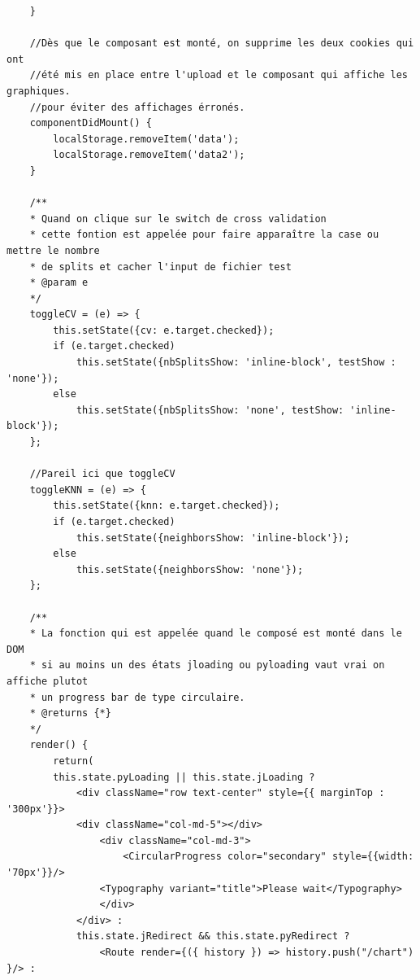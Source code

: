 \documentclass[a4paper,11pt]{article}
\begin{document}
\begin{itemize}
\begin{itemize}
\begin{verbatim}
    }

    //Dès que le composant est monté, on supprime les deux cookies qui ont
    //été mis en place entre l'upload et le composant qui affiche les graphiques.
    //pour éviter des affichages érronés.
    componentDidMount() {
        localStorage.removeItem('data');
        localStorage.removeItem('data2');
    }

    /**
    * Quand on clique sur le switch de cross validation
    * cette fontion est appelée pour faire apparaître la case ou mettre le nombre
    * de splits et cacher l'input de fichier test
    * @param e
    */
    toggleCV = (e) => {
        this.setState({cv: e.target.checked});
        if (e.target.checked)
            this.setState({nbSplitsShow: 'inline-block', testShow : 'none'});
        else
            this.setState({nbSplitsShow: 'none', testShow: 'inline-block'});
    };

    //Pareil ici que toggleCV
    toggleKNN = (e) => {
        this.setState({knn: e.target.checked});
        if (e.target.checked)
            this.setState({neighborsShow: 'inline-block'});
        else
            this.setState({neighborsShow: 'none'});
    };

    /**
    * La fonction qui est appelée quand le composé est monté dans le DOM
    * si au moins un des états jloading ou pyloading vaut vrai on affiche plutot
    * un progress bar de type circulaire.
    * @returns {*}
    */
    render() {
        return(
        this.state.pyLoading || this.state.jLoading ?
            <div className="row text-center" style={{ marginTop : '300px'}}>
            <div className="col-md-5"></div>
                <div className="col-md-3">
                    <CircularProgress color="secondary" style={{width: '70px'}}/>
                <Typography variant="title">Please wait</Typography>
                </div>
            </div> :
            this.state.jRedirect && this.state.pyRedirect ?
                <Route render={({ history }) => history.push("/chart")  }/> :


\end{verbatim}
\end{itemize}
\end{itemize}
\end{document}
